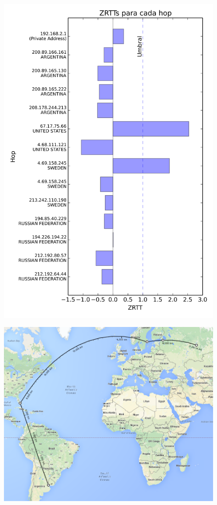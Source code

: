 \begin{figure}[htp]
 \centering
  \includegraphics[scale=0.5]{imgs/perm.png}
\end{figure}

\begin{figure}[htp]
 \centering
  \includegraphics[width=5in]{imgs/maps/perm.png}
\end{figure}

